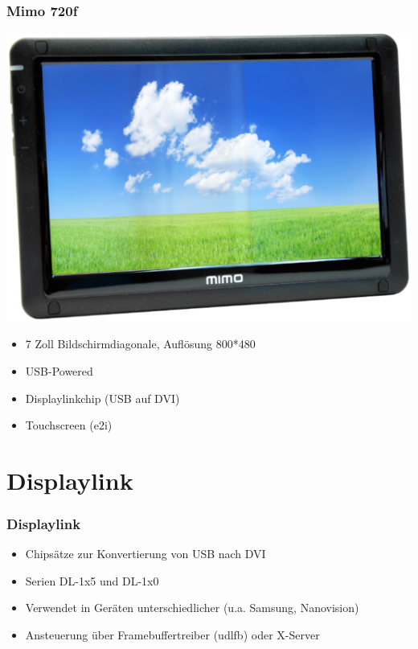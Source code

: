 \documentclass{beamer}
\begin{document}
	\begin{frame}
		\frametitle{Mimo 720f}
		\begin{center}
			\includegraphics[scale=0.3]{img/mimo720f}
		\end{center}
		
		\begin{itemize}
			\item 7 Zoll Bildschirmdiagonale, Auflösung 800*480
			\item USB-Powered
			\item Displaylinkchip (USB auf DVI)
			\item Touchscreen (e2i)
		\end{itemize}
	\end{frame}

	\section{Displaylink}
	
	\begin{frame}
		\frametitle{Displaylink}
		\begin{itemize}
			\item Chipsätze zur Konvertierung von USB nach DVI
			\item Serien DL-1x5 und DL-1x0
			\item Verwendet in Geräten unterschiedlicher (u.a. Samsung, Nanovision)
        	\item Ansteuerung über Framebuffertreiber (udlfb) oder X-Server
		\end{itemize}	
	\end{frame}	
\end{document}

